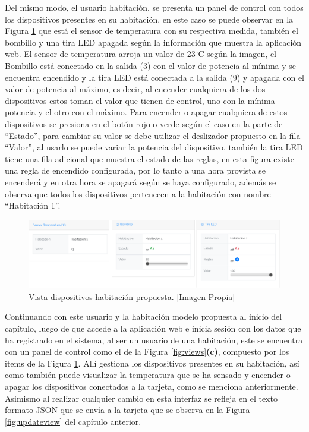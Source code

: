 Del mismo modo, el usuario habitación, se presenta un panel de control con todos los dispositivos presentes en su habitación, en este caso se puede observar en la Figura \ref{fig:r_app} que está el sensor de temperatura con su respectiva medida, también el bombillo y una tira LED apagada según la información que muestra la aplicación web. El sensor de temperatura arroja un valor de 23$^{\circ}$C según la imagen, el Bombillo está conectado en la salida (3) con el valor de potencia al mínima y se encuentra encendido y la tira LED está conectada a la salida (9) y apagada con el valor de potencia al máximo, es decir, al encender cualquiera de los dos dispositivos estos toman el valor que tienen de control, uno con la mínima potencia y el otro con el máximo. Para encender o apagar cualquiera de estos dispositivos se presiona en el botón rojo o verde según el caso en la parte de ``Estado'', para cambiar su valor se debe utilizar el deslizador propuesto en la fila ``Valor'', al usarlo se puede variar la potencia del dispositivo, también la tira LED tiene una fila adicional que muestra el estado de las reglas, en esta figura existe una regla de encendido configurada, por lo tanto a una hora provista se encenderá y en otra hora se apagará según se haya configurado, además se observa que todos los dispositivos pertenecen a la habitación con nombre ``Habitación 1''.

\begin{figure}[H]
	\centering
	\caption[Vista dispositivos habitación propuesta.]{Vista dispositivos habitación propuesta. [Imagen Propia]}
	\label{fig:r_app}
	\includegraphics[width=\linewidth]{Imagenes/R_app}
\end{figure}

Continuando con este usuario y la habitación modelo propuesta al inicio del capítulo, luego de que accede a la aplicación web e inicia sesión con los datos que ha registrado en el sistema, al ser un usuario de una habitación, este se encuentra con un panel de control como el de la Figura \ref{fig:views}\textbf{(c)}, compuesto por los items de la Figura \ref{fig:r_app}. Allí gestiona los dispositivos presentes en su habitación, así como también puede visualizar la temperatura que se ha sensado y encender o apagar los dispositivos conectados a la tarjeta, como se menciona anteriormente. Asimismo al realizar cualquier cambio en esta interfaz se refleja en el texto formato JSON que se envía a la tarjeta que se observa en la Figura \ref{fig:updateview} del capítulo anterior.\\


